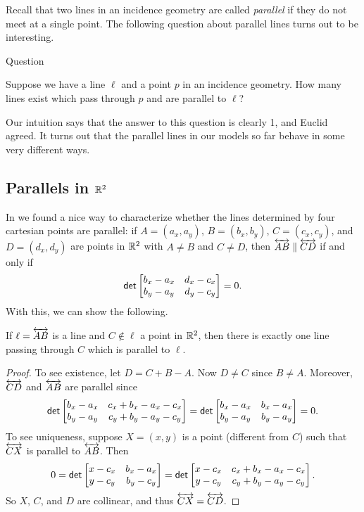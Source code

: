 Recall that two lines in an incidence geometry are called \emph{parallel} if they do not meet at a single point.
The following question about parallel lines turns out to be interesting.
\begin{titlebox}{Question}
\begin{center}
Suppose we have a line $\ell$ and a point $p$ in an incidence geometry.
How many lines exist which pass through $p$ and are parallel to $\ell$?
\end{center}
\end{titlebox}
Our intuition says that the answer to this question is clearly 1, and Euclid agreed.
It turns out that the parallel lines in our models so far behave in some very different ways.


\subsection{Parallels in $\mathbb{R}^2$}

In  we found a nice way to characterize whether the lines determined by four cartesian points are parallel: if $A = (a_x, a_y)$, $B = (b_x, b_y)$, $C = (c_x, c_y)$, and $D = (d_x, d_y)$ are points in $\mathbb{R}^2$ with $A \neq B$ and $C \neq D$, then $\overleftrightarrow{AB} \parallel \overleftrightarrow{CD}$ if and only if \[ \mathsf{det} \begin{bmatrix} b_x - a_x & d_x - c_x \\ b_y - a_y & d_y - c_y \end{bmatrix} = 0. \]
With this, we can show the following.

\begin{prop}
If $\ell = \overleftrightarrow{AB}$ is a line and $C \notin \ell$ a point in $\mathbb{R}^2$, then there is exactly one line passing through $C$ which is parallel to $\ell$.
\end{prop}

\begin{proof}
To see existence, let $D = C + B - A$.
Now $D \neq C$ since $B \neq A$.
Moreover, $\overleftrightarrow{CD}$ and $\overleftrightarrow{AB}$ are parallel since \[ \mathsf{det} \begin{bmatrix} b_x - a_x & c_x + b_x - a_x - c_x \\ b_y - a_y & c_y + b_y - a_y - c_y \end{bmatrix} = \mathsf{det} \begin{bmatrix} b_x - a_x & b_x - a_x \\ b_y - a_y & b_y - a_y \end{bmatrix} = 0. \]
To see uniqueness, suppose $X = (x, y)$ is a point (different from $C$) such that $\overleftrightarrow{CX}$ is parallel to $\overleftrightarrow{AB}$.
Then \[ 0 = \mathsf{det} \begin{bmatrix} x - c_x & b_x - a_x \\ y - c_y & b_y - c_y \end{bmatrix} = \mathsf{det} \begin{bmatrix} x - c_x & c_x + b_x - a_x - c_x \\ y - c_y & c_y + b_y - a_y - c_y \end{bmatrix}. \]
So $X$, $C$, and $D$ are collinear, and thus $\overleftrightarrow{CX} = \overleftrightarrow{CD}$.
\end{proof}

